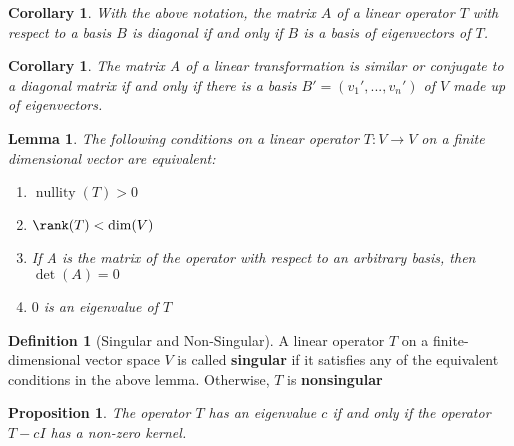\documentclass[12pt]{article}
\newtheorem{lem}[thm]{Lemma}  %
\newtheorem{cor}[thm]{Corollary}
\newtheorem{prop}[thm]{Proposition}
\theoremstyle{definition}
\newtheorem{defn}[thm]{Definition}
\theoremstyle{remark}
\numberwithin{equation}{section}
\newcommand\B[1]{\textbf{ #1}}
\DeclareMathOperator{\nullity}{nullity}
\begin{document}
\vspace{15pt}



\begin{cor}
        With the above notation, the matrix $A$ of a linear operator $T$ with respect to a basis $B$ is diagonal if and only if $B$ is a basis of eigenvectors of $T$.
\end{cor}

\vspace{15pt}

\begin{cor}
        The matrix A of a linear transformation is similar or conjugate to a diagonal matrix if and only if there is a basis $B' = (v_1',...,v_n')$ of $V$ made up of eigenvectors.
\end{cor}

\vspace{15pt}

\begin{lem}
        The following conditions on a linear operator $T:V\rightarrow V$ on a finite dimensional vector are equivalent: \begin{enumerate}
                \item $\nullity(T) > 0$
                \item $\rank(T) < \dim(V)$
                \item If A is the matrix of the operator with respect to an arbitrary basis, then $\det(A) = 0$
                \item $0$ is an eigenvalue of $T$
        \end{enumerate}
\end{lem}

\vspace{15pt}

\begin{defn}[Singular and Non-Singular]
        A linear operator $T$ on a finite-dimensional vector space $V$ is called \B{singular} if it satisfies any of the equivalent conditions in the above lemma. Otherwise, $T$ is \B{nonsingular}
\end{defn}

\vspace{15pt}

\begin{prop}
        The operator $T$ has an eigenvalue $c$ if and only if the operator $T - cI$ has a non-zero kernel.
\end{prop}


\vspace{15pt}
\end{document}
